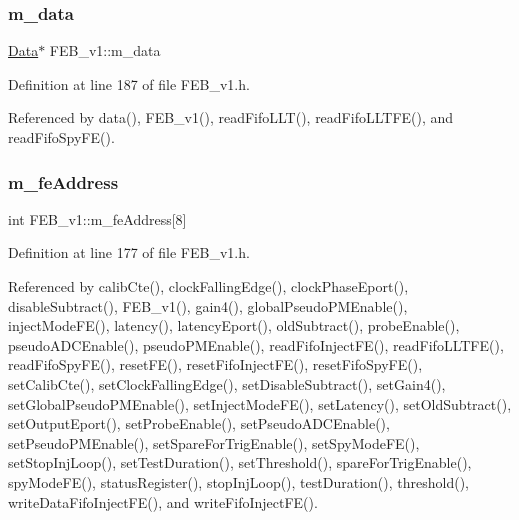 \subsubsection{\texorpdfstring{m\+\_\+data}{m\_data}}
{\footnotesize\ttfamily \hyperlink{classData}{Data}$\ast$ F\+E\+B\+\_\+v1\+::m\+\_\+data\hspace{0.3cm}{\ttfamily [private]}}



Definition at line 187 of file F\+E\+B\+\_\+v1.\+h.



Referenced by data(), F\+E\+B\+\_\+v1(), read\+Fifo\+L\+L\+T(), read\+Fifo\+L\+L\+T\+F\+E(), and read\+Fifo\+Spy\+F\+E().

\mbox{\label{classFEB__v1_a4e1945c2d5b434125f375e9d0fc6d99f}} 
\subsubsection{\texorpdfstring{m\+\_\+fe\+Address}{m\_feAddress}}
{\footnotesize\ttfamily int F\+E\+B\+\_\+v1\+::m\+\_\+fe\+Address\mbox{[}8\mbox{]}\hspace{0.3cm}{\ttfamily [private]}}



Definition at line 177 of file F\+E\+B\+\_\+v1.\+h.



Referenced by calib\+Cte(), clock\+Falling\+Edge(), clock\+Phase\+Eport(), disable\+Subtract(), F\+E\+B\+\_\+v1(), gain4(), global\+Pseudo\+P\+M\+Enable(), inject\+Mode\+F\+E(), latency(), latency\+Eport(), old\+Subtract(), probe\+Enable(), pseudo\+A\+D\+C\+Enable(), pseudo\+P\+M\+Enable(), read\+Fifo\+Inject\+F\+E(), read\+Fifo\+L\+L\+T\+F\+E(), read\+Fifo\+Spy\+F\+E(), reset\+F\+E(), reset\+Fifo\+Inject\+F\+E(), reset\+Fifo\+Spy\+F\+E(), set\+Calib\+Cte(), set\+Clock\+Falling\+Edge(), set\+Disable\+Subtract(), set\+Gain4(), set\+Global\+Pseudo\+P\+M\+Enable(), set\+Inject\+Mode\+F\+E(), set\+Latency(), set\+Old\+Subtract(), set\+Output\+Eport(), set\+Probe\+Enable(), set\+Pseudo\+A\+D\+C\+Enable(), set\+Pseudo\+P\+M\+Enable(), set\+Spare\+For\+Trig\+Enable(), set\+Spy\+Mode\+F\+E(), set\+Stop\+Inj\+Loop(), set\+Test\+Duration(), set\+Threshold(), spare\+For\+Trig\+Enable(), spy\+Mode\+F\+E(), status\+Register(), stop\+Inj\+Loop(), test\+Duration(), threshold(), write\+Data\+Fifo\+Inject\+F\+E(), and write\+Fifo\+Inject\+F\+E().

